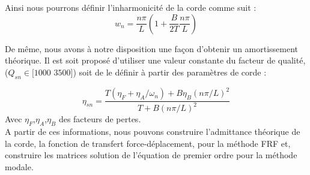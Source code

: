 Ainsi nous pourrons définir l'inharmonicité de la corde comme suit : 
\begin{equation}
w_n = \frac{n\pi}{L} (1+\frac{B}{2T} \frac{n\pi}{L})
\end{equation}

De même, nous avons à notre disposition une façon d'obtenir un amortissement
théorique. Il est soit proposé d'utiliser une valeur constante du facteur de
qualité, \\($Q_{sn} \in [1000 $ $3500]$) soit de le définir à partir des
paramètres de corde : 

\begin{equation}
\eta_{sn} = \frac{T(\eta_F + \eta_A/\omega_n) + B\eta_B(n\pi/L)^2}{T+B(n\pi/L)^2}
\end{equation}
Avec $\eta_F$,$\eta_A$,$\eta_B$ des facteurs de pertes. \\%

A partir de ces informations, nous pouvons construire l'admittance théorique de la corde, la fonction de transfert force-déplacement, pour la méthode FRF et, construire les matrices solution de l'équation de premier ordre pour la méthode modale.
